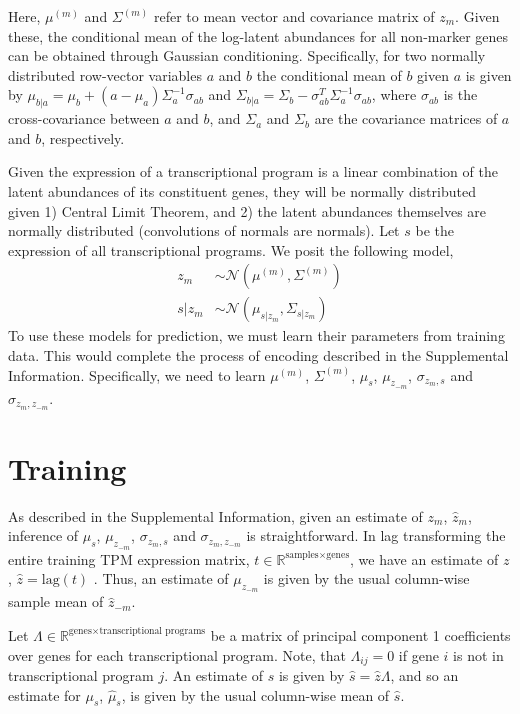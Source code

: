 \documentclass[10pt]{article}
\begin{document}
Here, $\mu^{(m)}$ and $\Sigma^{(m)}$ refer to mean vector and covariance matrix of $z_m$. Given these, the conditional mean of the log-latent abundances for all non-marker genes can be obtained through Gaussian conditioning. Specifically, for two normally distributed row-vector variables $a$ and $b$ the conditional mean of $b$ given $a$ is given by $\mu_{b|a} = \mu_b + (a - \mu_a)\Sigma_{a}^{-1}\sigma_{ab}$ and $\Sigma_{b|a} = \Sigma_{b} - \sigma_{ab}^T\Sigma_a^{-1}\sigma_{ab}$, where $\sigma_{ab}$ is the cross-covariance between $a$ and $b$, and $\Sigma_a$ and $\Sigma_b$ are the covariance matrices of $a$ and $b$, respectively.

Given the expression of a transcriptional program is a linear combination of the latent abundances of its constituent genes, they will be normally distributed given 1) Central Limit Theorem, and 2) the latent abundances themselves are normally distributed (convolutions of normals are normals). Let $s$ be the expression of all transcriptional programs. We posit the following model, 
\begin{align*}
z_m & \sim \mathcal{N}\left(\mu^{(m)}, \Sigma^{(m)} \right) \\
s|z_m & \sim \mathcal{N}(\mu_{s|z_m}, \Sigma_{s|z_m}) 
\end{align*}
To use these models for prediction, we must learn their parameters from training data. This would complete the process of encoding described in the Supplemental Information. Specifically, we need to learn $\mu^{(m)}$, $\Sigma^{(m)}$, $\mu_s$, $\mu_{z_{-m}}$, $\sigma_{z_m,s}$ and $\sigma_{z_m,z_{-m}}$.

\section{Training} \label{inference}

As described in the Supplemental Information, given an estimate of $z_m$, $\hat{z}_{m}$, inference of $\mu_s$, $\mu_{z_{-m}}$, $\sigma_{z_m,s}$ and $\sigma_{z_m,z_{-m}}$ is straightforward. In lag transforming the entire training TPM expression matrix, $t \in \mathbb{R}^{\textrm{samples} \times \textrm{genes}}$,  we have an estimate of $z$, $\hat{z} = \textrm{lag}(t)$ \cite{Biswas2016a}. Thus, an estimate of $\mu_{z_{-m}}$ is given by the usual column-wise sample mean of $\hat{z}_{-m}$. 

Let $\Lambda \in \mathbb{R}^{\textrm{genes} \times \textrm{transcriptional programs}}$ be a matrix of principal component 1 coefficients over genes for each transcriptional program. Note, that $\Lambda_{ij} = 0$ if gene $i$ is not in transcriptional program $j$. An estimate of $s$ is given by $\hat{s} = \hat{z}\Lambda$, and so an estimate for $\mu_s$, $\hat{\mu}_s$, is given by the usual column-wise mean of $\hat{s}$. 
\end{document}
